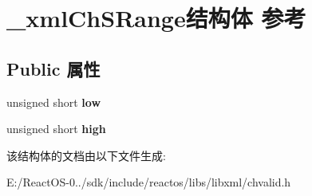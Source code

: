 \hypertarget{struct__xml_ch_s_range}{}\section{\+\_\+xml\+Ch\+S\+Range结构体 参考}
\label{struct__xml_ch_s_range}
\subsection*{Public 属性}
\begin{DoxyCompactItemize}
\item 
\mbox{\label{struct__xml_ch_s_range_ae6678d601f260427bcad0fd8474df97d}} 
unsigned short {\bfseries low}
\item 
\mbox{\label{struct__xml_ch_s_range_a050bc6f71d4bfcf455db4789ec725f1d}} 
unsigned short {\bfseries high}
\end{DoxyCompactItemize}


该结构体的文档由以下文件生成\+:\begin{DoxyCompactItemize}
\item 
E\+:/\+React\+O\+S-\/0../sdk/include/reactos/libs/libxml/chvalid.\+h\end{DoxyCompactItemize}
